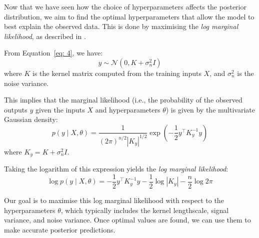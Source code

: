 \documentclass{article}
\begin{document}
Now that we have seen how the choice of hyperparameters affects the posterior distribution, we aim to find the optimal hyperparameters that allow the model to best explain the observed data. This is done by maximising the \textit{log marginal likelihood}, as described in \cite{rasmussen2006gaussian}.

\bigskip
\noindent
From Equation~\ref{eq: 4}, we have:
\[
y \sim \mathcal{N}(0, K + \sigma_n^2 I)
\]
where \( K \) is the kernel matrix computed from the training inputs \( X \), and \( \sigma_n^2 \) is the noise variance.

\noindent
This implies that the marginal likelihood (i.e., the probability of the observed outputs \( y \) given the inputs \( X \) and hyperparameters \( \theta \)) is given by the multivariate Gaussian density:
\[
p(y \mid X, \theta) = \frac{1}{(2\pi)^{n/2} |K_y|^{1/2}} \exp\left( -\frac{1}{2} y^\top K_y^{-1} y \right)
\]
where \( K_y = K + \sigma_n^2 I \).

\bigskip

\noindent
Taking the logarithm of this expression yields the \textit{log marginal likelihood}:
\begin{equation}\label{eq: 5}
\log p(y \mid X, \theta) = -\frac{1}{2} y^\top K_y^{-1} y - \frac{1}{2} \log |K_y| - \frac{n}{2} \log 2\pi
\end{equation}

\noindent
Our goal is to maximise this log marginal likelihood with respect to the hyperparameters \( \theta \), which typically includes the kernel lengthscale, signal variance, and noise variance. Once optimal values are found, we can use them to make accurate posterior predictions.
\end{document}
